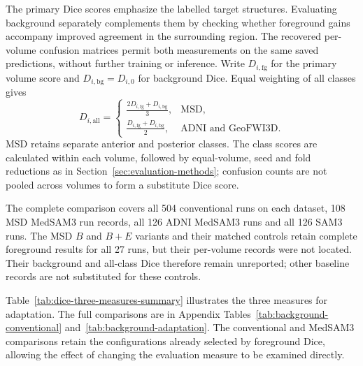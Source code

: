 \documentclass[12pt,a4paper]{article}
\begin{document}
\label{sec:metric-sensitivity-details}

The primary Dice scores emphasize the labelled target structures.
Evaluating background separately complements them by checking whether
foreground gains accompany improved agreement in the surrounding region.
The recovered per-volume confusion matrices permit both measurements
on the same saved predictions, without further training or inference.
Write $D_{i,\mathrm{fg}}$ for the primary volume score and
$D_{i,\mathrm{bg}}=D_{i,0}$ for background Dice. Equal weighting of
all classes gives
\begin{equation}
D_{i,\mathrm{all}}=
\begin{cases}
\displaystyle\frac{2D_{i,\mathrm{fg}}+D_{i,\mathrm{bg}}}{3},
 & \text{MSD},\\[.6em]
\displaystyle\frac{D_{i,\mathrm{fg}}+D_{i,\mathrm{bg}}}{2},
 & \text{ADNI and GeoFWI3D}.
\end{cases}
\label{eq:reported-all-class-dice}
\end{equation}
MSD retains separate anterior and posterior classes. The class scores
are calculated within each volume, followed by equal-volume, seed and
fold reductions as in Section~\ref{sec:evaluation-methods}; confusion
counts are not pooled across volumes to form a substitute Dice score.

The complete comparison covers all 504 conventional runs on each
dataset, 108 MSD MedSAM3 run records, all 126 ADNI MedSAM3 runs
and all 126 SAM3 runs.
The MSD $B$ and $B+E$ variants and their matched controls retain complete
foreground results for all 27 runs, but their per-volume records were
not located. Their background and all-class Dice therefore remain
unreported; other baseline records are not substituted for these controls.

Table~\ref{tab:dice-three-measures-summary} illustrates the three measures
for adaptation. The full comparisons are in Appendix Tables~\ref{tab:background-conventional}
and~\ref{tab:background-adaptation}. The conventional and MedSAM3 comparisons retain the
configurations already selected by foreground Dice, allowing the
effect of changing the evaluation measure to be examined directly.
\end{document}
